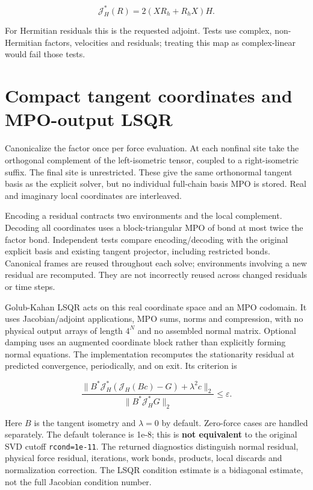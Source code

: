 \documentclass[10pt]{article}
\begin{document}
\[
\boxed{\mathcal J_H^*(R)=2(XR_h+R_hX)H.}
\]

For Hermitian residuals this is the requested adjoint. Tests use complex,
non-Hermitian factors, velocities and residuals; treating this map as
complex-linear would fail those tests.

\section*{Compact tangent coordinates and MPO-output LSQR}

Canonicalize the factor once per force evaluation. At each nonfinal site take
the orthogonal complement of the left-isometric tensor, coupled to a
right-isometric suffix. The final site is unrestricted. These give the same
orthonormal tangent basis as the explicit solver, but no individual full-chain
basis MPO is stored. Real and imaginary local coordinates are interleaved.

Encoding a residual contracts two environments and the local complement.
Decoding all coordinates uses a block-triangular MPO of bond at most twice the
factor bond. Independent tests compare encoding/decoding with the original
explicit basis and existing tangent projector, including restricted bonds.
Canonical frames are reused throughout each solve; environments involving a
new residual are recomputed. They are not incorrectly reused across changed
residuals or time steps.

Golub-Kahan LSQR acts on this real coordinate space and an MPO codomain. It
uses Jacobian/adjoint applications, MPO sums, norms and compression, with no
physical output arrays of length $4^N$ and no assembled normal matrix. Optional
damping uses an augmented coordinate block rather than explicitly forming
normal equations. The implementation recomputes the stationarity residual at
predicted convergence, periodically, and on exit. Its criterion is

\[
\frac{\|B^*\mathcal J_H^*(\mathcal J_H(Bc)-G)+\lambda^2c\|_2}
{\|B^*\mathcal J_H^*G\|_2}\leq\varepsilon.
\]

Here $B$ is the tangent isometry and $\lambda=0$ by default. Zero-force cases
are handled separately. The default tolerance is 1e-8; this is \textbf{not equivalent}
to the original SVD cutoff \texttt{rcond=1e-11}. The returned diagnostics distinguish
normal residual, physical force residual, iterations, work bonds, products,
local discards and normalization correction. The LSQR condition estimate is a
bidiagonal estimate, not the full Jacobian condition number.
\end{document}
